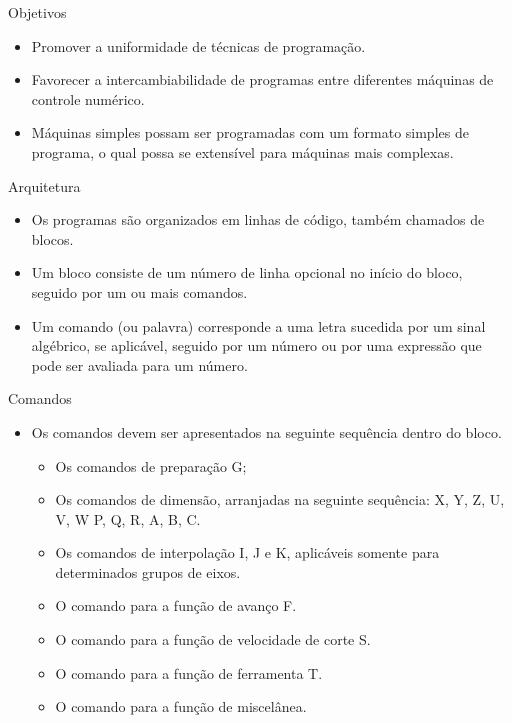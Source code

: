 \documentclass[aspectratio=169]{beamer}
\begin{document}
{%

\begin{frame}{Objetivos}
  \begin{itemize}
  \item {
    Promover a uniformidade de técnicas de programação.
  }
  \item {
    Favorecer a intercambiabilidade de programas entre diferentes máquinas de controle numérico.
  }
  \item {
    Máquinas simples possam ser programadas com um formato simples de programa,
    o qual possa se extensível para máquinas mais complexas.
  }
  \end{itemize}
\end{frame}


\begin{frame}{Arquitetura}
  \begin{itemize}
  \item {
    Os programas são organizados em linhas de código, também chamados de blocos.
  }
  \item {
    Um bloco consiste de um número de linha opcional no início do bloco, seguido por um 
    ou mais comandos.
  }
  \item {
    Um comando (ou palavra) corresponde a uma letra sucedida por um sinal algébrico, se aplicável, 
    seguido por um número ou por uma expressão que pode ser avaliada para um número.
  }
  \end{itemize}
\end{frame}

\begin{frame}{Comandos}
  \begin{itemize}
  \item {
    Os comandos devem ser apresentados na seguinte sequência dentro do bloco.
    \begin{itemize}
      \item Os comandos de preparação G;
      \item Os comandos de dimensão, arranjadas na seguinte sequência: X,
      Y, Z, U, V, W P, Q, R, A, B, C.
      \item Os comandos de interpolação I, J e K, aplicáveis somente para determinados 
      grupos de eixos.
      \item O comando para a função de avanço F.
      \item O comando para a função de velocidade de corte S.
      \item O comando para a função de ferramenta T.
      \item O comando para a função de miscelânea.
    \end{itemize}
  }
  \end{itemize}
\end{frame}

}
\end{document}
